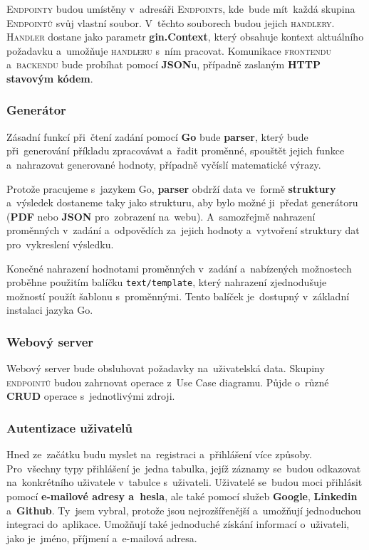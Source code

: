 \documentclass[14pt,a4paper]{article}
\begin{document}
            \textsc{Endpointy} budou umístěny v~adresáři \textsc{Endpoints}, kde~bude mít~každá skupina \textsc{Endpointů} svůj vlastní soubor. V~těchto souborech budou jejich \textsc{handlery}. \textsc{Handler} dostane jako parametr \textbf{gin.Context}, který obsahuje kontext aktuálního požadavku a~umožňuje \textsc{handleru} s~ním pracovat. Komunikace \textsc{frontendu} a~\textsc{backendu} bude probíhat pomocí \textbf{JSON}u, případně zaslaným \textbf{HTTP stavovým kódem}.

            \subsubsection{Generátor}
            Zásadní funkcí při~čtení zadání pomocí \textbf{Go} bude \textbf{parser}, který bude při~generování příkladu zpracovávat a~řadit proměnné, spouštět jejich funkce a~nahrazovat generované hodnoty, případně vyčíslí matematické výrazy.
            
            Protože pracujeme s~jazykem Go, \textbf{parser} obdrží data ve~formě \textbf{struktury} a~výsledek dostaneme taky jako strukturu, aby bylo možné ji~předat generátoru (\textbf{PDF} nebo \textbf{JSON} pro~zobrazení na~webu). A~samozřejmě nahrazení proměnných v~zadání a~odpovědích za~jejich hodnoty a~vytvoření struktury dat pro~vykreslení výsledku.

            Konečné nahrazení hodnotami proměnných v~zadání a~nabízených možnostech proběhne použitím balíčku \texttt{text/template}, který nahrazení zjednodušuje možností použít šablonu s~proměnnými. Tento balíček je~dostupný v~základní instalaci jazyka Go. \parencite{GoTextTemplate}

            \subsubsection{Webový server}
            Webový server bude obsluhovat požadavky na~uživatelská data. Skupiny \textsc{endpointů} budou zahrnovat operace z~Use Case diagramu. Půjde o~různé \textbf{CRUD} operace s~jednotlivými zdroji.

            \subsubsection{Autentizace uživatelů}
            Hned ze~začátku budu myslet na~registraci a~přihlášení více způsoby. Pro~všechny typy přihlášení je~jedna tabulka, jejíž záznamy se~budou odkazovat na~konkrétního uživatele v~tabulce s~uživateli. Uživatelé se~budou moci přihlásit pomocí \textbf{e-mailové adresy a~hesla}, ale také pomocí služeb \textbf{Google}, \textbf{Linkedin} a~\textbf{Github}. Ty~jsem vybral, protože jsou nejrozšířenější a~umožňují jednoduchou integraci do~aplikace. Umožňují také jednoduché získání informací o~uživateli, jako je~jméno, příjmení a~e-mailová adresa.
            
\end{document}
